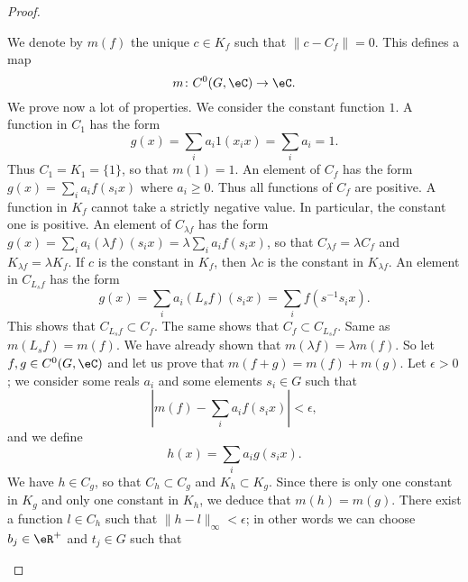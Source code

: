 \begin{proof}
\begin{subproof}
		\spitem[Definition of \( m\)]
		We denote by \( m(f)\) the unique \( c\in K_f\) such that \( \| c-C_f \|=0\). This defines a map
		\begin{equation}
			m\colon C^0(G,\eC)\to \eC.
		\end{equation}
		We prove now a lot of properties.
		\spitem[\( m(1)=1\)]
		We consider the constant function \( 1\). A function in \( C_1\) has the form
		\begin{equation}
			g(x)=\sum_ia_i1(x_ix)=\sum_ia_i=1.
		\end{equation}
		Thus \( C_1=K_1=\{ 1 \}\), so that \( m(1)=1\).
		An element of \( C_f\) has the form \( g(x)=\sum_ia_if(s_ix)\) where \( a_i\geq 0\). Thus all functions of \( C_f\) are positive. A function in \( K_f\) cannot take a strictly negative value. In particular, the constant one is positive.
		\spitem[\( m(\lambda f)=\lambda m(f)\)]
		An element of \( C_{\lambda f}\) has the form \( g(x)=\sum_ia_i(\lambda f)(s_ix)=\lambda\sum_ia_if(s_ix)\), so that \( C_{\lambda f}=\lambda C_f\) and \( K_{\lambda f}=\lambda K_f\). If \( c\) is the constant in \( K_f\), then \( \lambda c\) is the constant in \( K_{\lambda f}\).
		\spitem[\( m(L_sf)=m(f)\)]
		An element in \( C_{L_sf}\) has the form
		\begin{equation}
			g(x)=\sum_ia_i(L_sf)(s_ix)=\sum_if(s^{-1}s_ix).
		\end{equation}
		This shows that \( C_{L_sf}\subset C_f\). The same shows that \( C_f\subset C_{L_sf}\).
		\spitem[\( m(R_sf)=m(f)\)]
		Same as \( m(L_sf)=m(f)\).
		\spitem[\( m\) is linear]
		We have already shown that \( m(\lambda f)=\lambda m(f)\). So let \( f,g\in C^0(G,\eC)\) and let us prove that \( m(f+g)=m(f)+m(g)\). Let \( \epsilon>0\); we consider some reals \( a_i\) and some elements \( s_i\in G\) such that
		\begin{equation}        \label{EQooDDZXooWIPAhX}
			| m(f)-\sum_ia_if(s_ix) |<\epsilon,
		\end{equation}
		and we define
		\begin{equation}
			h(x)=\sum_ia_ig(s_ix).
		\end{equation}
		We have \( h\in C_g\), so that \( C_h\subset C_g\) and \( K_h\subset K_g\). Since there is only one constant in \( K_g\) and only one constant in \( K_h\), we deduce that \( m(h)=m(g)\). There exist a function \( l\in C_h\) such that \( \| h-l \|_{\infty}<\epsilon\); in other words we can choose \( b_j\in \eR^+\) and \( t_j\in G\) such that
		\begin{equation}

\end{equation}
\end{subproof}
\end{proof}
